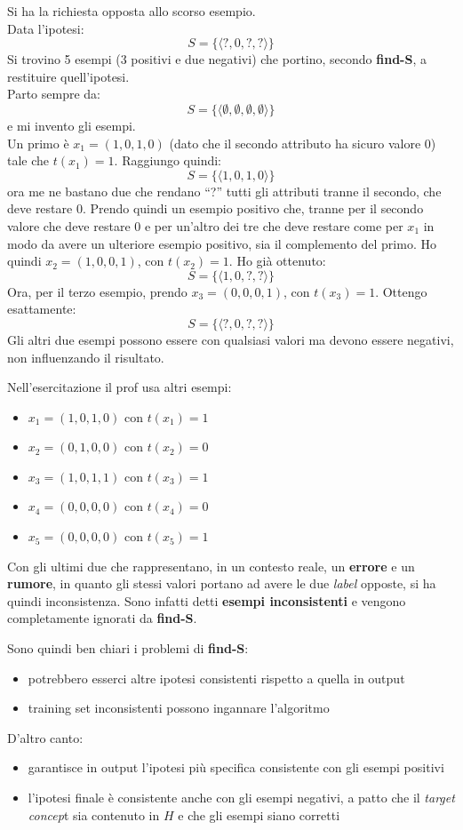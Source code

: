 \documentclass[a4paper,12pt, oneside]{book}
\begin{document}
\begin{esempio}
  Si ha la richiesta opposta allo scorso esempio. \\
  Data l'ipotesi:
  \[S=\{\langle ?,0,?,?\rangle\}\]
  Si trovino 5 esempi (3 positivi e due negativi) che portino, secondo
  \textbf{find-S}, a restituire quell'ipotesi.\\
  Parto sempre da:
  \[S=\{\langle\emptyset,\emptyset,\emptyset,\emptyset\rangle\}\]
  e mi invento gli esempi.\\
  Un primo è $x_1=(1,0,1,0)$ (dato che il secondo attributo ha sicuro valore 0)
  tale che $t(x_1)=1$. Raggiungo quindi: 
  \[S=\{\langle 1,0,1,0\rangle\}\]
  ora me ne bastano due che rendano ``?'' tutti gli attributi tranne il secondo,
  che deve restare 0. Prendo quindi un esempio positivo che, tranne per il secondo
  valore che deve restare 0 e per un'altro dei tre che deve restare come per
  $x_1$ in modo da avere un ulteriore esempio positivo, sia il complemento del
  primo. Ho quindi $x_2=(1,0,0,1)$, con 
  $t(x_2)=1$. Ho già ottenuto:
  \[S=\{\langle 1,0,?,?\rangle\}\]
  Ora, per il terzo esempio, prendo $x_3=(0,0,0,1)$, con $t(x_3)=1$. Ottengo
  esattamente:
  \[S=\{\langle ?,0,?,?\rangle\}\]
  Gli altri due esempi possono essere con qualsiasi valori ma devono essere
  negativi, non influenzando il risultato.\\
  \begin{shaded}
    Nell'esercitazione il prof usa altri esempi:
    \begin{itemize}
      \item $x_1=(1,0,1,0)$ con $t(x_1)=1$
      \item $x_2=(0,1,0,0)$ con $t(x_2)=0$
      \item $x_3=(1,0,1,1)$ con $t(x_3)=1$
      \item $x_4=(0,0,0,0)$ con $t(x_4)=0$
      \item $x_5=(0,0,0,0)$ con $t(x_5)=1$
    \end{itemize}
    Con gli ultimi due che rappresentano, in un contesto reale,
    un \textbf{errore} e un \textbf{rumore}, in quanto gli stessi valori portano
    ad avere le due \textit{label} opposte, si ha quindi inconsistenza. Sono
    infatti detti \textbf{esempi inconsistenti} e vengono completamente ignorati
    da \textbf{find-S}.
  \end{shaded}
\end{esempio}
Sono quindi ben chiari i problemi di \textbf{find-S}:
\begin{itemize}
  \item potrebbero esserci altre ipotesi consistenti rispetto a quella in output
  \item training set inconsistenti possono ingannare l'algoritmo
\end{itemize}
D'altro canto:
\begin{itemize}
  \item garantisce in output l'ipotesi più specifica consistente con gli esempi
  positivi
  \item l'ipotesi finale è consistente anche con gli esempi negativi, a patto
  che il \textit{target concep}t sia contenuto in $H$ e che gli esempi siano
  corretti
\end{itemize}
\end{document}
